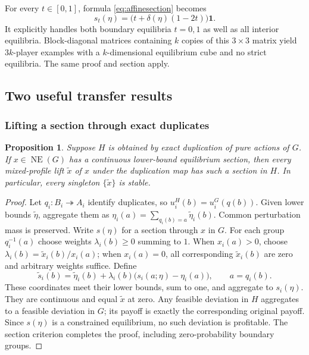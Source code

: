 \documentclass[11pt]{article}
\newtheorem{proposition}[theorem]{Proposition}
\theoremstyle{definition}
\newcommand{\NE}{\operatorname{NE}}
\begin{document}
For every $t\in[0,1]$, formula \eqref{eq:affinesection} becomes
\[
 s_t(\eta)=\bigl(t+\delta(\eta)(1-2t)\bigr)\mathbf1.
\]
It explicitly handles both boundary equilibria $t=0,1$ as well as all
interior equilibria. Block-diagonal matrices containing $k$ copies of this
$3\times3$ matrix yield $3k$-player examples with a $k$-dimensional equilibrium
cube and no strict equilibria. The same proof and section apply.

\subsection{Two useful transfer results}
\subsubsection{Lifting a section through exact duplicates}
\begin{proposition}\label{prop:duplicates}
Suppose $H$ is obtained by exact duplication of pure actions of $G$.
If $x\in\NE(G)$ has a continuous lower-bound equilibrium section, then every
mixed-profile lift $\widetilde x$ of $x$ under the duplication map has such a
section in $H$. In particular, every singleton $\{\widetilde x\}$ is stable.
\end{proposition}
\begin{proof}
Let $q_i:B_i\twoheadrightarrow A_i$ identify duplicates, so
$u_i^H(b)=u_i^G(q(b))$. Given lower bounds $\widetilde\eta$, aggregate them as
$\eta_i(a)=\sum_{q_i(b)=a}\widetilde\eta_i(b)$. Common perturbation mass is
preserved. Write $s(\eta)$ for a section through $x$ in $G$.
For each group $q_i^{-1}(a)$ choose weights $\lambda_i(b)\ge0$ summing to $1$.
When $x_i(a)>0$, choose $\lambda_i(b)=\widetilde x_i(b)/x_i(a)$; when
$x_i(a)=0$, all corresponding $\widetilde x_i(b)$ are zero and arbitrary
weights suffice. Define
\[
 \widetilde s_i(b)=\widetilde\eta_i(b)+\lambda_i(b)
                  \bigl(s_i(a;\eta)-\eta_i(a)\bigr),\qquad a=q_i(b).
\]
These coordinates meet their lower bounds, sum to one, and aggregate to
$s_i(\eta)$. They are continuous and equal $\widetilde x$ at zero.
Any feasible deviation in $H$ aggregates to a feasible deviation in $G$;
its payoff is exactly the corresponding original payoff. Since $s(\eta)$
is a constrained equilibrium, no such deviation is profitable.
The section criterion completes the proof, including zero-probability
boundary groups.
\end{proof}
\end{document}

